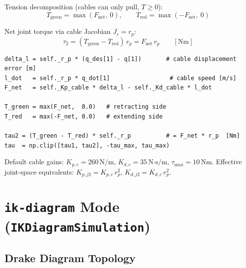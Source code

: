 \documentclass[11pt, a4paper]{article}
\begin{document}
Tension decomposition (cables can only pull, $T \ge 0$):
\begin{equation}
  T_{\text{green}} = \max(F_{\text{net}},\ 0), \qquad
  T_{\text{red}}   = \max(-F_{\text{net}},\ 0)
\end{equation}

Net joint torque via cable Jacobian $J_c = r_p$:
\begin{equation}
  \tau_2 = (T_{\text{green}} - T_{\text{red}})\,r_p = F_{\text{net}}\,r_p
  \qquad [\text{Nm}]
\end{equation}

\begin{lstlisting}
delta_l = self._r_p * (q_des[1] - q[1])       # cable displacement error [m]
l_dot   = self._r_p * q_dot[1]                 # cable speed [m/s]
F_net   = self._Kp_cable * delta_l - self._Kd_cable * l_dot

T_green = max(F_net,  0.0)   # retracting side
T_red   = max(-F_net, 0.0)   # extending side

tau2 = (T_green - T_red) * self._r_p          # = F_net * r_p  [Nm]
tau  = np.clip([tau1, tau2], -tau_max, tau_max)
\end{lstlisting}

Default cable gains: $K_{p,c} = 260\,\text{N/m}$, $K_{d,c} = 35\,\text{N·s/m}$,
$\tau_{\max} = 10\,\text{Nm}$.
Effective joint-space equivalents: $K_{p,j2} = K_{p,c}\,r_p^2$,
$K_{d,j2} = K_{d,c}\,r_p^2$.

\section{\texttt{ik-diagram} Mode (\texttt{IKDiagramSimulation})}

\subsection{Drake Diagram Topology}

\begin{center}
\end{center}
\end{document}
